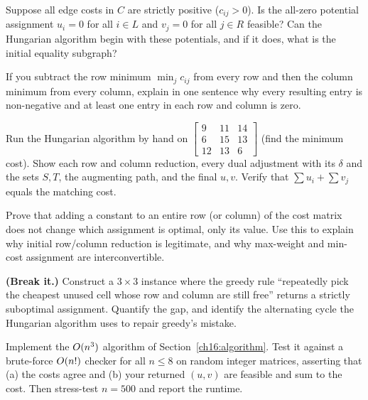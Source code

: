\begin{exercise}
Suppose all edge costs in $C$ are strictly positive ($c_{ij} > 0$). Is the all-zero potential assignment $u_i = 0$ for all $i\in L$ and $v_j = 0$ for all $j\in R$ feasible? Can the Hungarian algorithm begin with these potentials, and if it does, what is the initial equality subgraph?
\end{exercise}

\begin{exercise}
If you subtract the row minimum $\min_j c_{ij}$ from every row and then the column minimum from every column, explain in one sentence why every resulting entry is non-negative and at least one entry in each row and column is zero.
\end{exercise}

\begin{exercise}
Run the Hungarian algorithm by hand on
\(
\left[\begin{smallmatrix} 9&11&14\\ 6&15&13\\ 12&13&6\end{smallmatrix}\right]
\)
(find the minimum cost). Show each row and column reduction, every dual adjustment with its $\delta$ and the sets $S,T$, the augmenting path, and the final $u,v$. Verify that $\sum u_i+\sum v_j$ equals the matching cost.
\end{exercise}

\begin{exercise}
Prove that adding a constant to an entire row (or column) of the cost matrix does not change which assignment is optimal, only its value. Use this to explain why initial row/column reduction is legitimate, and why max-weight and min-cost assignment are interconvertible.
\end{exercise}

\begin{exercise}
\textbf{(Break it.)} Construct a $3\times3$ instance where the greedy rule ``repeatedly pick the cheapest unused cell whose row and column are still free'' returns a strictly suboptimal assignment. Quantify the gap, and identify the alternating cycle the Hungarian algorithm uses to repair greedy's mistake.
\end{exercise}

\begin{exercise}
Implement the $O(n^3)$ algorithm of Section~\ref{ch16:algorithm}. Test it against a brute-force $O(n!)$ checker for all $n\le 8$ on random integer matrices, asserting that (a) the costs agree and (b) your returned $(u,v)$ are feasible and sum to the cost. Then stress-test $n=500$ and report the runtime.
\end{exercise}

